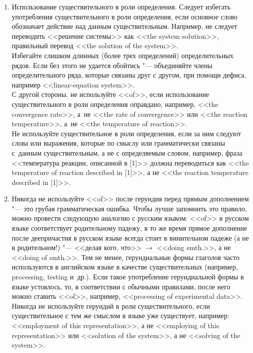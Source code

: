 \documentclass[a5paper, 10pt, twoside, numbers=enddot]{scrartcl}
\newcommand{\etal}{и~др.\xspace}
\begin{document}
\begin{enumerate}
  \item Использование существительного в роли определения. Следует избегать употребления
    существительного в роли определения, если основное слово обозначает действие над данным
    существительным. Например, не следует переводить <<решение системы>> как <<the system
    solution>>, правильный перевод <<the solution of the system>>.\\ [4pt]
    Избегайте слишком длинных (более трех определений) определительных рядов. Если без этого не
    удается обойтись "--- объединяйте члены определительного ряда, которые связаны друг с другом,
    при помощи дефиса, например <<linear-equation system>>.\\ [4pt]
    С другой стороны, не используйте <<of>>, если использование существительного в роли определения
    оправдано, например, <<the convergence rate>>, а~не <<the rate of convergence>> или <<the
    reaction temperature>>, а~не <<the tem\-perature of reaction>>.\\ [4pt]
    Не используйте существительное в роли определения, если за ним следуют слова или выражения,
    которые по смыслу или грамматически связаны с~данным существительным, а не с определяемым
    словом, например, фраза <<температура реакции, описанной в [1]>> должна переводиться как <<the
    temperature of reaction described in [1]>>, а не <<the reaction temperature described in [1]>>.

  \item Никогда не используйте <<of>> после герундия перед прямым дополнением "--- это грубая
    грамматическая ошибка. Чтобы лучше запомнить это правило, можно провести следующую аналогию с
    русским языком: <<of>> в русском языке соответствует родительному падежу, в то же время прямое
    дополнение после деепричастия в русском языке всегда стоит в винительном падеже (а не в
    родительном!) "--- <<делая кого, что>> $\rightarrow$ <<doing smth.>>, а не <<doing of smth.>>.
    Тем не менее, герундиальные формы глаголов часто используются в английском языке в качестве
    существительных (например, processing, testing \etal). Если такое употребление герундиальной
    формы в языке устоялось, то, в соответствии с обычными правилами, после него можно ставить
    <<of>>, например, <<processing of experimental data>>.\\ [4pt]
    Никогда не используйте герундий в роли существительного, если существительное с тем же смыслом в
    языке уже существует, например: <<employment of this representation>>, а не <<employing of this
    representation>> или <<solution of the system>>, а не <<solving of the system>>.


\end{enumerate}
\end{document}
